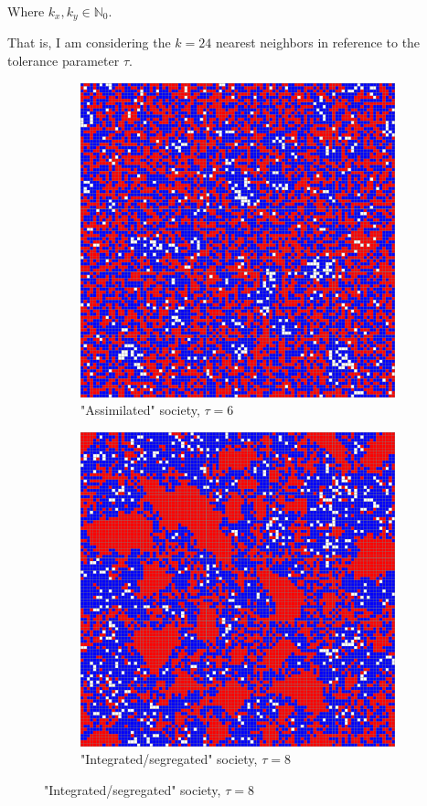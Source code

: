\documentclass[../main.tex]{subfiles}
\begin{document}
Where $k_x, k_y \in \mathbb{N}_0$. 


That is, I am considering the $k=24$ nearest neighbors in reference to the tolerance parameter $\tau$.

\begin{figure}[H]
\centering
\caption{Schelling model simulations by $\tau$ required same-type neighbors}
	\begin{subfigure}{0.45\textwidth}	
	\centering
    \caption{"Assimilated" society, $\tau = 6$}
	\includegraphics[width=\textwidth]{figs/schelling_6.pdf}	
	\end{subfigure}	
	\begin{subfigure}{0.45\textwidth}	
	\centering
    \caption{"Integrated/segregated" society, $\tau = 8$}
	\includegraphics[width=\textwidth]{figs/schelling_8.pdf}	

\end{subfigure}
\end{figure}
\end{document}
